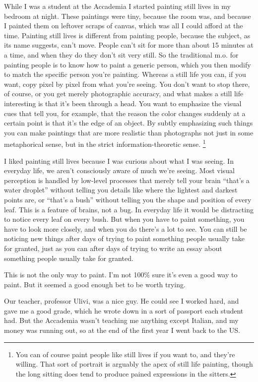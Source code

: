 While I was a student at the Accademia I started painting still lives in
my bedroom at night. These paintings were tiny, because the room was,
and because I painted them on leftover scraps of canvas, which was all I
could afford at the time. Painting still lives is different from
painting people, because the subject, as its name suggests, can't move.
People can't sit for more than about 15 minutes at a time, and when they
do they don't sit very still. So the traditional m.o. for painting
people is to know how to paint a generic person, which you then modify
to match the specific person you're painting. Whereas a still life you
can, if you want, copy pixel by pixel from what you're seeing. You don't
want to stop there, of course, or you get merely photographic accuracy,
and what makes a still life interesting is that it's been through a
head. You want to emphasize the visual cues that tell you, for example,
that the reason the color changes suddenly at a certain point is that
it's the edge of an object. By subtly emphasizing such things you can
make paintings that are more realistic than photographs not just in some
metaphorical sense, but in the strict information-theoretic sense.
\footnote{You can of course paint people like still lives if you want to,
and they're willing. That sort of portrait is arguably the apex of still
life painting, though the long sitting does tend to produce pained
expressions in the sitters.}

I liked painting still lives because I was curious about what I was
seeing. In everyday life, we aren't consciously aware of much we're
seeing. Most visual perception is handled by low-level processes that
merely tell your brain ``that's a water droplet'' without telling you
details like where the lightest and darkest points are, or ``that's a
bush'' without telling you the shape and position of every leaf. This is
a feature of brains, not a bug. In everyday life it would be distracting
to notice every leaf on every bush. But when you have to paint
something, you have to look more closely, and when you do there's a lot
to see. You can still be noticing new things after days of trying to
paint something people usually take for granted, just as you can after
days of trying to write an essay about something people usually take for
granted.

This is not the only way to paint. I'm not 100\% sure it's even a good
way to paint. But it seemed a good enough bet to be worth trying.

Our teacher, professor Ulivi, was a nice guy. He could see I worked
hard, and gave me a good grade, which he wrote down in a sort of
passport each student had. But the Accademia wasn't teaching me anything
except Italian, and my money was running out, so at the end of the first
year I went back to the US.

